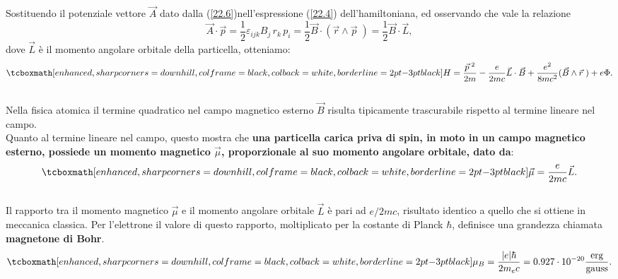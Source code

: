 Sostituendo il potenziale vettore $\vec{A}$ dato dalla (\ref{22.6})nell'espressione (\ref{22.4}) dell'hamiltoniana, ed osservando che vale la relazione
\begin{equation}
\vec{A}\cdot\vec{p}=\frac{1}{2}\varepsilon_{ijk}B_{j}\, r_{k}\, p_{i}=\frac{1}{2}\vec{B}\cdot(\vec{r}\wedge\vec{p}\;)=\frac{1}{2}\vec{B}\cdot\vec{L} ,
\end{equation}
dove $\vec{L}$ è il momento angolare orbitale della particella, otteniamo:
	\begin{equation}
		\tcboxmath[enhanced, sharp corners=downhill, colframe=black, colback=white, borderline={2pt}{-3pt}{black}]{
			H=\frac{\vec{p}^{\;2}}{2m}-\frac{e}{2mc}\vec{L}\cdot\vec{B}+\frac{e^{2}}{8mc^{2}}(\vec{B}\wedge\vec{r}\;)+e\Phi .
			}
	\label{22.10}
	\end{equation}\\
	
Nella fisica atomica il termine quadratico nel campo magnetico esterno $\vec{B}$ risulta tipicamente trascurabile rispetto al termine lineare nel campo.\\

Quanto al termine lineare nel campo, questo mostra che \textbf{una particella carica priva di spin, in moto in un campo magnetico esterno, possiede un momento magnetico $\vec{\mu}$, proporzionale al suo momento angolare orbitale, dato da}:
	\begin{equation}
		\tcboxmath[enhanced, sharp corners=downhill, colframe=black, colback=white, borderline={2pt}{-3pt}{black}]{
			\vec{\mu}=\frac{e}{2mc}\vec{L} .
			}
	\label{22.11}
	\end{equation}\\
	
Il rapporto tra il momento magnetico $\vec{\mu}$ e il momento angolare orbitale $\vec{L}$ è pari ad $e/2mc$, risultato identico a quello che si ottiene in meccanica classica. Per l'elettrone il valore di questo rapporto, moltiplicato per la costante di Planck $\hbar$, definisce una grandezza chiamata \textbf{magnetone di Bohr}.
	\begin{equation}
		\tcboxmath[enhanced, sharp corners=downhill, colframe=black, colback=white, borderline={2pt}{-3pt}{black}]{
			\mu_{B}=\frac{|e|\hbar}{2m_{e}c}=0.927\cdot10^{-20}\frac{\textrm{erg}}{\textrm{gauss}} .
			}
	\end{equation}\\
	
